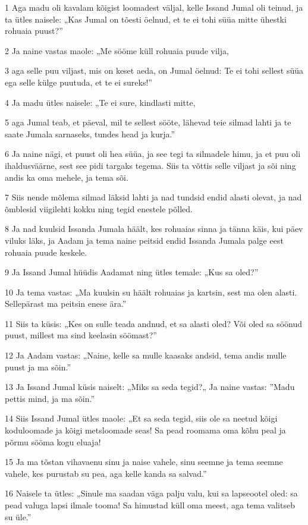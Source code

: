 \par 1 Aga madu oli kavalam kõigist loomadest väljal, kelle Issand Jumal oli teinud, ja ta ütles naisele: „Kas Jumal on tõesti öelnud, et te ei tohi süüa mitte ühestki rohuaia puust?”
\par 2 Ja naine vastas maole: „Me sööme küll rohuaia puude vilja,
\par 3 aga selle puu viljast, mis on keset aeda, on Jumal öelnud: Te ei tohi sellest süüa ega selle külge puutuda, et te ei sureks!”
\par 4 Ja madu ütles naisele: „Te ei sure, kindlasti mitte,
\par 5 aga Jumal teab, et päeval, mil te sellest sööte, lähevad teie silmad lahti ja te saate Jumala sarnaseks, tundes head ja kurja.”
\par 6 Ja naine nägi, et puust oli hea süüa, ja see tegi ta silmadele himu, ja et puu oli ihaldusväärne, sest see pidi targaks tegema. Siis ta võttis selle viljast ja sõi ning andis ka oma mehele, ja tema sõi.
\par 7 Siis nende mõlema silmad läksid lahti ja nad tundsid endid alasti olevat, ja nad õmblesid viigilehti kokku ning tegid enestele põlled.
\par 8 Ja nad kuulsid Issanda Jumala häält, kes rohuaias sinna ja tänna käis, kui päev viluks läks, ja Aadam ja tema naine peitsid endid Issanda Jumala palge eest rohuaia puude keskele.
\par 9 Ja Issand Jumal hüüdis Aadamat ning ütles temale: „Kus sa oled?”
\par 10 Ja tema vastas: „Ma kuulsin su häält rohuaias ja kartsin, sest ma olen alasti. Sellepärast ma peitsin enese ära.”
\par 11 Siis ta küsis: „Kes on sulle teada andnud, et sa alasti oled? Või oled sa söönud puust, millest ma sind keelasin söömast?”
\par 12 Ja Aadam vastas: „Naine, kelle sa mulle kaasaks andsid, tema andis mulle puust ja ma sõin.”
\par 13 Ja Issand Jumal küsis naiselt: „Miks sa seda tegid?„ Ja naine vastas: ”Madu pettis mind, ja ma sõin.”
\par 14 Siis Issand Jumal ütles maole: „Et sa seda tegid, siis ole sa neetud kõigi koduloomade ja kõigi metsloomade seas! Sa pead roomama oma kõhu peal ja põrmu sööma kogu eluaja!
\par 15 Ja ma tõstan vihavaenu sinu ja naise vahele, sinu seemne ja tema seemne vahele, kes purustab su pea, aga kelle kanda sa salvad.”
\par 16 Naisele ta ütles: „Sinule ma saadan väga palju valu, kui sa lapseootel oled: sa pead valuga lapsi ilmale tooma! Sa himustad küll oma meest, aga tema valitseb su üle.”
